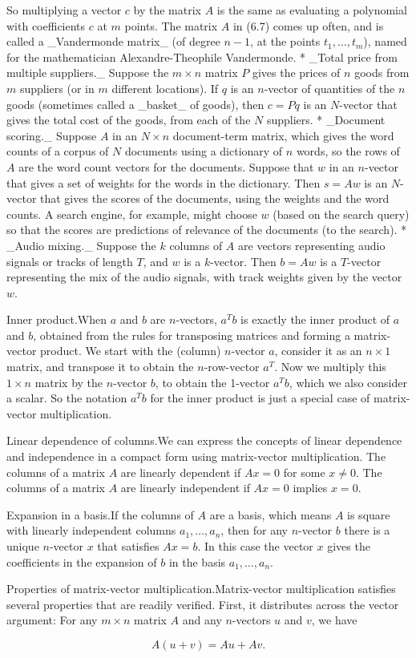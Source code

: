 So multiplying a vector \(c\) by the matrix \(A\) is the same as evaluating a polynomial with coefficients \(c\) at \(m\) points. The matrix \(A\) in (6.7) comes up often, and is called a _Vandermonde matrix_ (of degree \(n-1\), at the points \(t_{1},\ldots,t_{m}\)), named for the mathematician Alexandre-Theophile Vandermonde.
* _Total price from multiple suppliers._ Suppose the \(m\times n\) matrix \(P\) gives the prices of \(n\) goods from \(m\) suppliers (or in \(m\) different locations). If \(q\) is an \(n\)-vector of quantities of the \(n\) goods (sometimes called a _basket_ of goods), then \(c=Pq\) is an \(N\)-vector that gives the total cost of the goods, from each of the \(N\) suppliers.
* _Document scoring._ Suppose \(A\) in an \(N\times n\) document-term matrix, which gives the word counts of a corpus of \(N\) documents using a dictionary of \(n\) words, so the rows of \(A\) are the word count vectors for the documents. Suppose that \(w\) in an \(n\)-vector that gives a set of weights for the words in the dictionary. Then \(s=Aw\) is an \(N\)-vector that gives the scores of the documents, using the weights and the word counts. A search engine, for example, might choose \(w\) (based on the search query) so that the scores are predictions of relevance of the documents (to the search).
* _Audio mixing._ Suppose the \(k\) columns of \(A\) are vectors representing audio signals or tracks of length \(T\), and \(w\) is a \(k\)-vector. Then \(b=Aw\) is a \(T\)-vector representing the mix of the audio signals, with track weights given by the vector \(w\).

Inner product.When \(a\) and \(b\) are \(n\)-vectors, \(a^{T}b\) is exactly the inner product of \(a\) and \(b\), obtained from the rules for transposing matrices and forming a matrix-vector product. We start with the (column) \(n\)-vector \(a\), consider it as an \(n\times 1\) matrix, and transpose it to obtain the \(n\)-row-vector \(a^{T}\). Now we multiply this \(1\times n\) matrix by the \(n\)-vector \(b\), to obtain the 1-vector \(a^{T}b\), which we also consider a scalar. So the notation \(a^{T}b\) for the inner product is just a special case of matrix-vector multiplication.

Linear dependence of columns.We can express the concepts of linear dependence and independence in a compact form using matrix-vector multiplication. The columns of a matrix \(A\) are linearly dependent if \(Ax=0\) for some \(x\neq 0\). The columns of a matrix \(A\) are linearly independent if \(Ax=0\) implies \(x=0\).

Expansion in a basis.If the columns of \(A\) are a basis, which means \(A\) is square with linearly independent columns \(a_{1},\ldots,a_{n}\), then for any \(n\)-vector \(b\) there is a unique \(n\)-vector \(x\) that satisfies \(Ax=b\). In this case the vector \(x\) gives the coefficients in the expansion of \(b\) in the basis \(a_{1},\ldots,a_{n}\).

Properties of matrix-vector multiplication.Matrix-vector multiplication satisfies several properties that are readily verified. First, it distributes across the vector argument: For any \(m\times n\) matrix \(A\) and any \(n\)-vectors \(u\) and \(v\), we have

\[A(u+v)=Au+Av.\] 